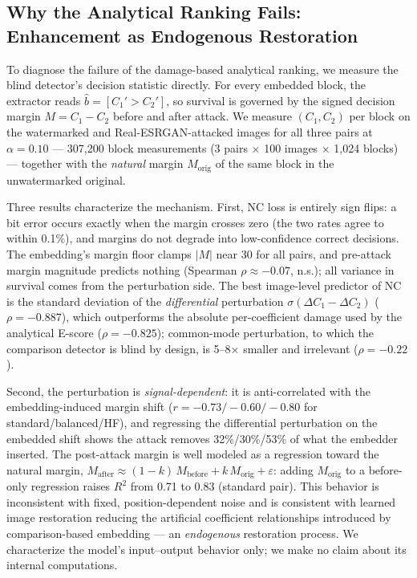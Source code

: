 \documentclass[conference]{IEEEtran}
\begin{document}
\subsection{Why the Analytical Ranking Fails: Enhancement as Endogenous
Restoration}
\label{sec:margin}

To diagnose the failure of the damage-based analytical ranking, we
measure the blind detector's decision statistic directly. For every
embedded block, the extractor reads $\hat{b} = [C_1' > C_2']$, so
survival is governed by the signed decision margin $M = C_1 - C_2$
before and after attack. We measure $(C_1, C_2)$ per block on the
watermarked and Real-ESRGAN-attacked images for all three pairs at
$\alpha = 0.10$ --- 307,200 block measurements (3 pairs $\times$ 100
images $\times$ 1,024 blocks) --- together with the \emph{natural}
margin $M_{\mathrm{orig}}$ of the same block in the unwatermarked
original.

Three results characterize the mechanism. First, NC loss is entirely
sign flips: a bit error occurs exactly when the margin crosses zero
(the two rates agree to within 0.1\%), and margins do not degrade into
low-confidence correct decisions. The embedding's margin floor clamps
$|M|$ near 30 for all pairs, and pre-attack margin magnitude predicts
nothing (Spearman $\rho \approx -0.07$, n.s.); all variance in survival
comes from the perturbation side. The best image-level predictor of NC
is the standard deviation of the \emph{differential} perturbation
$\sigma(\Delta C_1 - \Delta C_2)$ ($\rho = -0.887$), which outperforms
the absolute per-coefficient damage used by the analytical E-score
($\rho = -0.825$); common-mode perturbation, to which the comparison
detector is blind by design, is 5--8$\times$ smaller and irrelevant
($\rho = -0.22$).

Second, the perturbation is \emph{signal-dependent}: it is
anti-correlated with the embedding-induced margin shift
($r = -0.73 / -0.60 / -0.80$ for standard/balanced/HF), and regressing
the differential perturbation on the embedded shift shows the attack
removes 32\%/30\%/53\% of what the embedder inserted. The post-attack
margin is well modeled as a regression toward the natural margin,
$M_{\mathrm{after}} \approx (1-k)\,M_{\mathrm{before}} +
k\,M_{\mathrm{orig}} + \varepsilon$: adding $M_{\mathrm{orig}}$ to a
before-only regression raises $R^2$ from 0.71 to 0.83 (standard pair).
This behavior is inconsistent with fixed, position-dependent noise and
is consistent with learned image restoration reducing the artificial
coefficient relationships introduced by comparison-based embedding ---
an \emph{endogenous} restoration process. We characterize the model's
input--output behavior only; we make no claim about its internal
computations.
\end{document}
